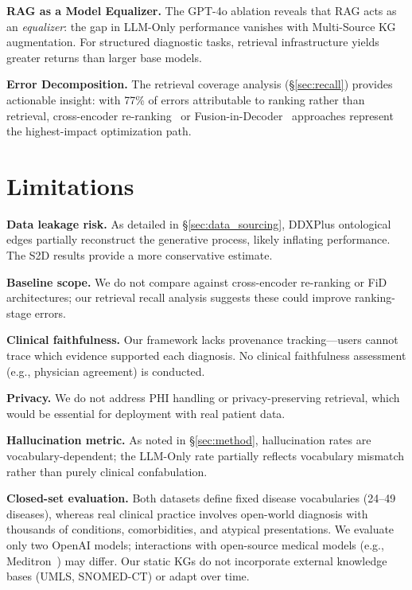 \documentclass[runningheads]{llncs}
\begin{document}
\textbf{RAG as a Model Equalizer.}
The GPT-4o ablation reveals that RAG acts as an \emph{equalizer}: the gap in LLM-Only performance vanishes with Multi-Source KG augmentation. For structured diagnostic tasks, retrieval infrastructure yields greater returns than larger base models.

\textbf{Error Decomposition.}
The retrieval coverage analysis (\S\ref{sec:recall}) provides actionable insight: with 77\% of errors attributable to ranking rather than retrieval, cross-encoder re-ranking~\cite{nogueira2020passage} or Fusion-in-Decoder~\cite{izacard2021leveraging} approaches represent the highest-impact optimization path.

\section{Limitations}
\label{sec:limitations}

\textbf{Data leakage risk.} As detailed in \S\ref{sec:data_sourcing}, DDXPlus ontological edges partially reconstruct the generative process, likely inflating performance. The S2D results provide a more conservative estimate.

\textbf{Baseline scope.} We do not compare against cross-encoder re-ranking or FiD architectures; our retrieval recall analysis suggests these could improve ranking-stage errors.

\textbf{Clinical faithfulness.} Our framework lacks provenance tracking---users cannot trace which evidence supported each diagnosis. No clinical faithfulness assessment (e.g., physician agreement) is conducted.

\textbf{Privacy.} We do not address PHI handling or privacy-preserving retrieval, which would be essential for deployment with real patient data.

\textbf{Hallucination metric.} As noted in \S\ref{sec:method}, hallucination rates are vocabulary-dependent; the LLM-Only rate partially reflects vocabulary mismatch rather than purely clinical confabulation.

\textbf{Closed-set evaluation.} Both datasets define fixed disease vocabularies (24--49 diseases), whereas real clinical practice involves open-world diagnosis with thousands of conditions, comorbidities, and atypical presentations. We evaluate only two OpenAI models; interactions with open-source medical models (e.g., Meditron~\cite{chen2023meditron}) may differ. Our static KGs do not incorporate external knowledge bases (UMLS, SNOMED-CT) or adapt over time.
\end{document}
